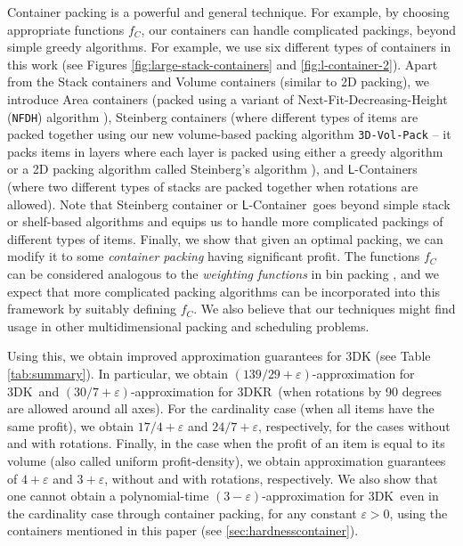 \documentclass[10pt,a4paper]{amsart}
\newcommand{\kvn}[1]{#1}
\newcommand{\ari}[1]{#1}
\newcommand{\kvnrnew}[1]{\todo[color=yellow,size=\tiny]{KVN: #1}}
\newcommand{\eps}{\varepsilon}
\newcommand{\tdk}{\textsc{3DK}}
\newcommand{\tdkr}{\textsc{3DKR}}
\newcommand{\NFDH}{\texttt{NFDH}\xspace}
\theoremstyle{definition}
\newcommand{\LContainer}{$\mathsf{L}$-Container}
\begin{document}
Container packing is a powerful and general technique. For example, by choosing appropriate functions $f_C$, our containers can handle complicated packings, beyond simple greedy algorithms. 
For example, we use six different types of containers in this work (see Figures  \ref{fig:large-stack-containers} and \ref{fig:l-container-2}).
Apart from the Stack containers and Volume containers (similar to 2D packing), we introduce Area containers (packed using a variant of Next-Fit-Decreasing-Height (\NFDH) algorithm \cite{coffman1980performance}), Steinberg containers (where different types of items are packed together using our new volume-based packing algorithm \texttt{3D-Vol-Pack}
-- it  packs items in layers where each layer is packed using either a greedy algorithm or a 2D packing algorithm called Steinberg's algorithm \cite{steinberg}), and \LContainer{}s (where two different types of stacks are packed together when rotations are allowed). 
Note that Steinberg container or \LContainer~goes beyond simple stack or shelf-based algorithms and equips us to handle more complicated packings of different types of items. 
\ari{Finally, we show that given an optimal packing, we can modify it to some \emph{container packing} having significant profit.} The functions $f_C$ can be considered analogous to the {\em weighting functions} in bin packing \cite{coffman1980performance}, and we expect \kvn{that} more complicated packing algorithms can be incorporated into this framework by suitably defining $f_C$.
We also believe that our techniques might find usage in other multidimensional packing and scheduling problems. 



Using this, we obtain improved approximation guarantees for 3DK (see Table \ref{tab:summary}).
In particular, we obtain $(139/29+\eps)$-approximation for \tdk~and $(30/7+\eps)$-approximation for \tdkr~(when rotations by 90 degrees are allowed around all axes). 
For the cardinality case (when all items have the same profit), we obtain $17/4 +\eps$ and $24/7+\eps$, respectively, for the cases without and with rotations. Finally, in the case when the profit of an item is equal to its volume (also called uniform profit-density), we obtain approximation guarantees of $4+\eps$ and $3+\eps$, without and with rotations, respectively. We also show that one cannot obtain a polynomial-time $(3-\eps)$-approximation \ari{for \tdk~even in the cardinality case} through container packing, for any constant $\eps>0$,  using the containers mentioned in this paper (see \cref{sec:hardnesscontainer}).
\end{document}
